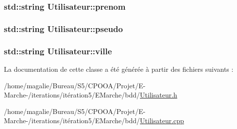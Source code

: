 \hypertarget{class_utilisateur_a7cbd4b405cdff4fed665d74ddca1a61f}{
\subsubsection[{prenom}]{\setlength{\rightskip}{0pt plus 5cm}std\-::string Utilisateur\-::prenom\hspace{0.3cm}{\ttfamily [protected]}}}\label{class_utilisateur_a7cbd4b405cdff4fed665d74ddca1a61f}
\hypertarget{class_utilisateur_acefb31a3f7e204657236a73770e4b36c}{
\subsubsection[{pseudo}]{\setlength{\rightskip}{0pt plus 5cm}std\-::string Utilisateur\-::pseudo\hspace{0.3cm}{\ttfamily [protected]}}}\label{class_utilisateur_acefb31a3f7e204657236a73770e4b36c}
\hypertarget{class_utilisateur_ad5a26fdf60b16be6d077aecd582edaab}{
\subsubsection[{ville}]{\setlength{\rightskip}{0pt plus 5cm}std\-::string Utilisateur\-::ville\hspace{0.3cm}{\ttfamily [protected]}}}\label{class_utilisateur_ad5a26fdf60b16be6d077aecd582edaab}


La documentation de cette classe a été générée à partir des fichiers suivants \-:\begin{DoxyCompactItemize}
\item 
/home/magalie/\-Bureau/\-S5/\-C\-P\-O\-O\-A/\-Projet/\-E-\/\-Marche-\//iterations/itération5/\-E\-Marche/bdd/\hyperlink{_utilisateur_8h}{Utilisateur.\-h}\item 
/home/magalie/\-Bureau/\-S5/\-C\-P\-O\-O\-A/\-Projet/\-E-\/\-Marche-\//iterations/itération5/\-E\-Marche/bdd/\hyperlink{_utilisateur_8cpp}{Utilisateur.\-cpp}\end{DoxyCompactItemize}
